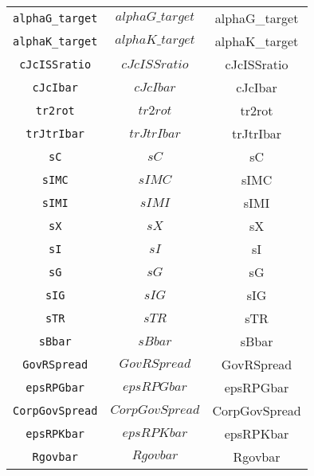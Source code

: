 \begin{center}
\begin{longtable}{ccc}
\texttt{alphaG\_target} & $alphaG\_target$ & alphaG\_target\\
\texttt{alphaK\_target} & $alphaK\_target$ & alphaK\_target\\
\texttt{cJcISSratio} & $cJcISSratio$ & cJcISSratio\\
\texttt{cJcIbar} & $cJcIbar$ & cJcIbar\\
\texttt{tr2rot} & $tr2rot$ & tr2rot\\
\texttt{trJtrIbar} & $trJtrIbar$ & trJtrIbar\\
\texttt{sC} & $sC$ & sC\\
\texttt{sIMC} & $sIMC$ & sIMC\\
\texttt{sIMI} & $sIMI$ & sIMI\\
\texttt{sX} & $sX$ & sX\\
\texttt{sI} & $sI$ & sI\\
\texttt{sG} & $sG$ & sG\\
\texttt{sIG} & $sIG$ & sIG\\
\texttt{sTR} & $sTR$ & sTR\\
\texttt{sBbar} & $sBbar$ & sBbar\\
\texttt{GovRSpread} & $GovRSpread$ & GovRSpread\\
\texttt{epsRPGbar} & $epsRPGbar$ & epsRPGbar\\
\texttt{CorpGovSpread} & $CorpGovSpread$ & CorpGovSpread\\
\texttt{epsRPKbar} & $epsRPKbar$ & epsRPKbar\\
\texttt{Rgovbar} & $Rgovbar$ & Rgovbar\\
\hline%
\end{longtable}
\end{center}
